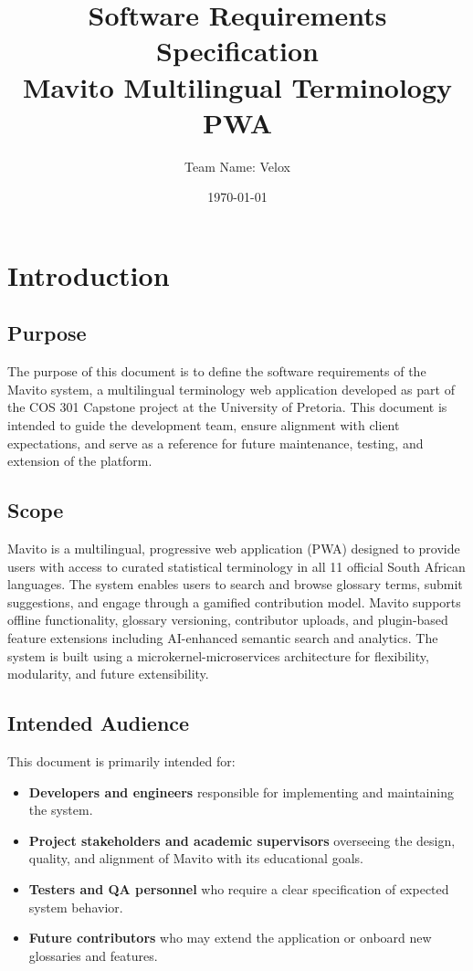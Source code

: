 \documentclass[12pt]{article}
\title{Software Requirements Specification\\\large\textbf{Mavito Multilingual Terminology PWA}}
\author{Team Name: Velox}
\date{\today}
\begin{document}
\maketitle
\tableofcontents
\newpage

\section{Introduction}
\subsection{Purpose}
The purpose of this document is to define the software requirements of the Mavito system, a multilingual terminology web application developed as part of the COS 301 Capstone project at the University of Pretoria. This document is intended to guide the development team, ensure alignment with client expectations, and serve as a reference for future maintenance, testing, and extension of the platform.

\subsection{Scope}
Mavito is a multilingual, progressive web application (PWA) designed to provide users with access to curated statistical terminology in all 11 official South African languages. The system enables users to search and browse glossary terms, submit suggestions, and engage through a gamified contribution model. Mavito supports offline functionality, glossary versioning, contributor uploads, and plugin-based feature extensions including AI-enhanced semantic search and analytics. The system is built using a microkernel-microservices architecture for flexibility, modularity, and future extensibility.

\subsection{Intended Audience}
This document is primarily intended for:
\begin{itemize}
    \item \textbf{Developers and engineers} responsible for implementing and maintaining the system.
    \item \textbf{Project stakeholders and academic supervisors} overseeing the design, quality, and alignment of Mavito with its educational goals.
    \item \textbf{Testers and QA personnel} who require a clear specification of expected system behavior.
    \item \textbf{Future contributors} who may extend the application or onboard new glossaries and features.
\end{itemize}
\end{document}
